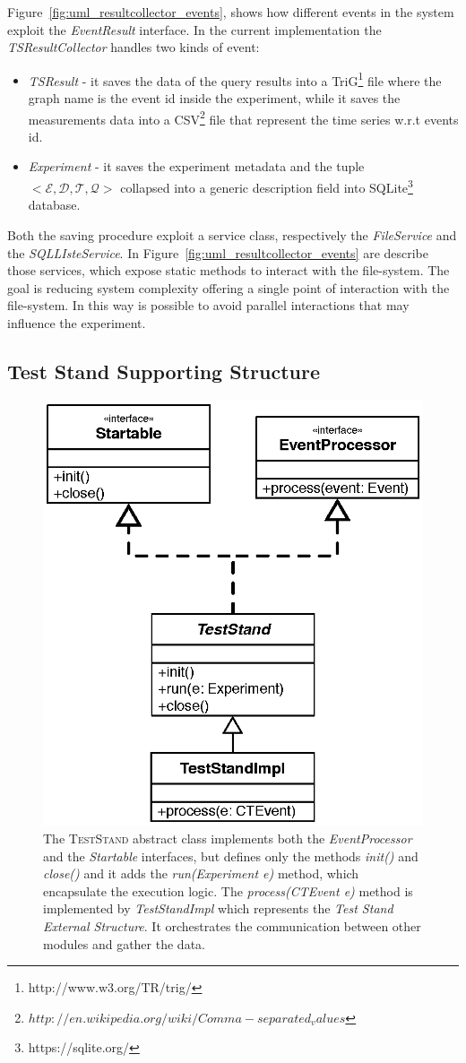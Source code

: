 Figure~\ref{fig:uml_resultcollector_events}, shows how different events in the system exploit the \textit{EventResult} interface. In the current implementation the \textit{TSResultCollector} handles two kinds of event:
\begin{itemize}
\item \textit{TSResult} - it saves the data of the query results into a TriG\footnote{http://www.w3.org/TR/trig/} file where the graph name is the event id inside the experiment, while it saves the measurements data into a CSV\footnote{$http://en.wikipedia.org/wiki/Comma-separated_values$} file that represent the time series w.r.t events id. 
\item \textit{Experiment} - it saves the experiment metadata and the tuple \\ $<\mathcal{E},\mathcal{D},\mathcal{T},\mathcal{Q}>$ collapsed into a generic description field into SQLite\footnote{https://sqlite.org/} database.
\end{itemize} 

Both the saving procedure exploit a service class, respectively the \textit{FileService} and the \textit{SQLLIsteService}. In Figure~\ref{fig:uml_resultcollector_events} are describe those services, which expose static methods to interact with the file-system. The goal is reducing system complexity offering a single point of interaction with the file-system. In this way is possible  to avoid parallel interactions that may influence the experiment. 


\subsection{Test Stand Supporting Structure}\label{sec:teststand-impl}


\begin{figure}[tbh]
  \centering
	\includegraphics[width=0.5\linewidth]{images/uml_teststand}
	\caption[\name \textsc{TestStand} - UML Schema]{The \textsc{TestStand} abstract class implements both the \textit{EventProcessor} and the \textit{Startable} interfaces, but defines only the methods \textit{init()} and \textit{close()}  and it adds the \textit{run(Experiment e)} method, which encapsulate the execution logic. The \textit{process(CTEvent e)} method is implemented by \textit{TestStandImpl} which represents the \textit{Test Stand External Structure}. It orchestrates the communication between other modules and gather the data.}
  	\label{fig:uml_teststand}
\end{figure}


